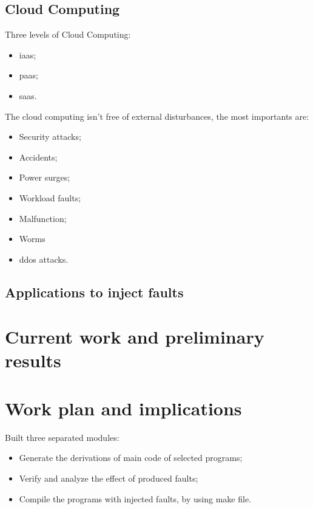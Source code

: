 \subsection{Cloud Computing}

Three levels of Cloud Computing:

\begin{itemize}
	\item \ac{iaas};
	\item \ac{paas};
	\item \ac{saas}.
\end{itemize}

The cloud computing isn't free of external disturbances\cite{wolter2012resilience}, the most importants are:
\begin{itemize}
 	\item Security attacks;
 	\item Accidents;
 	\item Power surges;
 	\item Workload faults;
 	\item Malfunction;
 	\item Worms
 	\item \ac{ddos} attacks.
 \end{itemize} 

\subsection{Applications to inject faults}

\newpage
\section{Current work and preliminary results}

\newpage
\section{Work plan and implications}

Built three separated modules:

\begin{itemize}
	\item Generate the derivations of main code of selected programs;
	\item Verify and analyze the effect of produced faults;
	\item Compile the programs with injected faults, by using make file.
\end{itemize}

